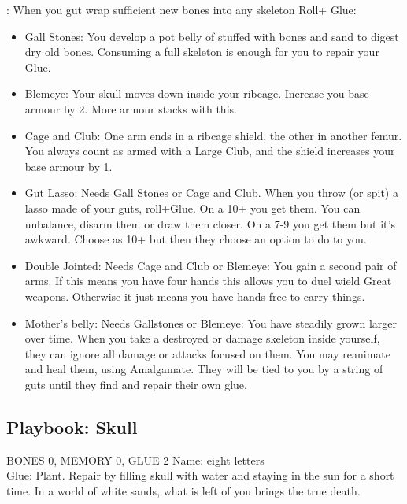 : When you gut wrap sufficient new bones into any skeleton Roll+ Glue: 
\begin{itemize}
\myitem On a 10+ heal 3 or heal someone else 3 
\myitemend On a 7-9 as 10+ but reduce glue to zero until repaired
\item  Gall Stones: You develop a pot belly of stuffed with bones and sand to digest dry old bones. Consuming a full skeleton is enough for you to repair your Glue.
\item  Blemeye: Your skull moves down inside your ribcage. Increase you base armour by 2. More armour stacks with this.
\item  Cage and Club: One arm ends in a ribcage shield, the other in another femur. You always count as armed with a Large Club, and the shield increases your base armour by 1. 
\item  Gut Lasso: Needs Gall Stones or Cage and Club. When you throw (or spit) a lasso made of your guts, roll+Glue.
\myitem On a 10+ you get them. You can unbalance, disarm them or draw them closer.
\myitemend On a 7-9 you get them but it's awkward. Choose as 10+ but then they choose an option to do to you.
\item  Double Jointed: Needs Cage and Club or Blemeye: You gain a second pair of arms. If this means you have four hands this allows you to duel wield Great weapons. Otherwise it just means you have hands free to carry things.
\item Mother's belly: Needs Gallstones or Blemeye: You have steadily grown larger over time. When you take a destroyed or damage skeleton inside yourself, they can ignore all damage or attacks focused on them. You may reanimate and heal them, using Amalgamate. They will be tied to you by a string of guts until they find and repair their own glue. 
\end{itemize}

\newpage
\subsection{Playbook: Skull}
BONES 0, MEMORY 0, GLUE 2  
Name: eight letters 
\\ Glue: Plant. Repair by filling skull with water and staying in the sun for a short time.
In a world of white sands, what is left of you brings the true death. 

